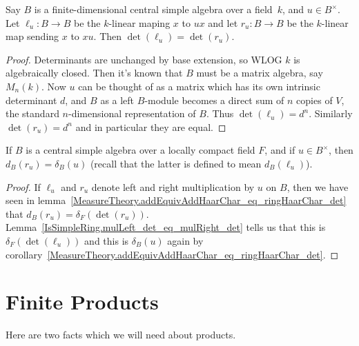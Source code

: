 \begin{lemma}
  \label{IsSimpleRing.mulLeft_det_eq_mulRight_det}
  \leanok
  Say $B$ is a finite-dimensional central simple algebra over a field~$k$,
  and $u\in B^\times$. Let $\ell_u:B\to B$ be the $k$-linear maping $x$ to $ux$ and
  let $r_u:B\to B$ be the $k$-linear map sending $x$ to $xu$. Then
  $\det(\ell_u)=\det(r_u)$.
\end{lemma}
\begin{proof}
  Determinants are unchanged by base extension, so WLOG $k$ is algebraically closed.
  Then it's known that $B$ must be a matrix algebra, say $M_n(k)$. Now $u$ can be thought
  of as a matrix which has its own intrinsic determinant $d$, and $B$ as a left $B$-module
  becomes a direct sum of $n$ copies of $V$, the standard $n$-dimensional representation of $B$.
  Thus $\det(\ell_u)=d^n$. Similarly $\det(r_u)=d^n$ and in particular they are equal.
\end{proof}

\begin{corollary}
  \label{IsSimpleRing.ringHaarChar_eq_addEquivAddHaarChar_mulRight}
  \leanok
  If $B$ is a central simple algebra over a locally compact field $F$, and if $u\in B^\times$,
  then $d_B(r_u)=\delta_B(u)$ (recall that the latter is defined to mean $d_B(\ell_u)$).
\end{corollary}
\begin{proof}
  \leanok
  If $\ell_u$ and $r_u$ denote left and right multiplication by $u$ on $B$, then we have
  seen in lemma~\ref{MeasureTheory.addEquivAddHaarChar_eq_ringHaarChar_det} that $d_B(r_u)=\delta_F(\det(r_u))$.
  Lemma~\ref{IsSimpleRing.mulLeft_det_eq_mulRight_det} tells
  us that this is $\delta_F(\det(\ell_u))$ and this is $\delta_B(u)$ again by
  corollary~\ref{MeasureTheory.addEquivAddHaarChar_eq_ringHaarChar_det}.
\end{proof}

\section{Finite Products}

Here are two facts which we will need about products.

